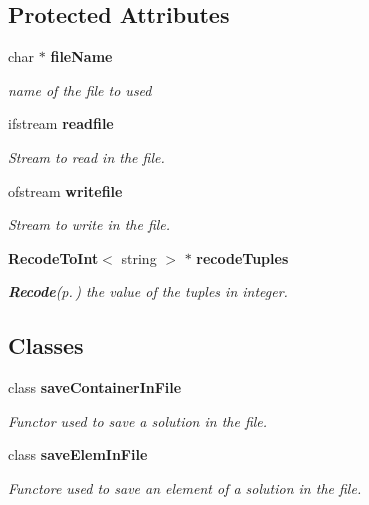 \subsection*{Protected Attributes}
\begin{CompactItemize}
\item 
char $\ast$ {\bf file\-Name}\label{class_tabular_d_b_file_d48b2a86d8e34a7ad1f4f5872a6586f0}

\begin{CompactList}\small\item\em name of the file to used \item\end{CompactList}\item 
ifstream {\bf readfile}\label{class_tabular_d_b_file_0a3868d33194605eadb13364e948daf4}

\begin{CompactList}\small\item\em Stream to read in the file. \item\end{CompactList}\item 
ofstream {\bf writefile}\label{class_tabular_d_b_file_b4ed25e63980291bd4dbb9c7ba42fe06}

\begin{CompactList}\small\item\em Stream to write in the file. \item\end{CompactList}\item 
{\bf Recode\-To\-Int}$<$ string $>$ $\ast$ {\bf recode\-Tuples}\label{class_tabular_d_b_file_575cf6ce6322a34660235ca35fe5b6a2}

\begin{CompactList}\small\item\em {\bf Recode}{\rm (p.\,\pageref{class_recode})} the value of the tuples in integer. \item\end{CompactList}\end{CompactItemize}
\subsection*{Classes}
\begin{CompactItemize}
\item 
class {\bf save\-Container\-In\-File}
\begin{CompactList}\small\item\em Functor used to save a solution in the file. \item\end{CompactList}\item 
class {\bf save\-Elem\-In\-File}
\begin{CompactList}\small\item\em Functore used to save an element of a solution in the file. \item\end{CompactList}\end{CompactItemize}


